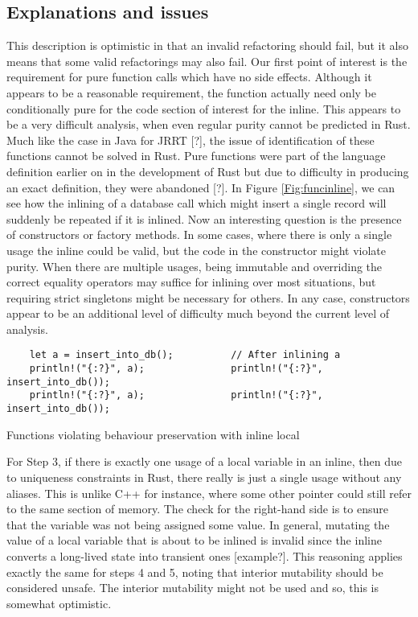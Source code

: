\subsection{Explanations and issues}
This description is optimistic in that an invalid refactoring should fail, but it also means that some valid refactorings may also fail. Our first point of interest is the requirement for pure function calls which have no side effects. Although it appears to be a reasonable requirement, the function actually need only be conditionally pure for the code section of interest for the inline. This appears to be a very difficult analysis, when even regular purity cannot be predicted in Rust. Much like the case in Java for JRRT [?], the issue of identification of these functions cannot be solved in Rust. Pure functions were part of the language definition earlier on in the development of Rust but due to difficulty in producing an exact definition, they were abandoned [?]. In Figure \ref{Fig:funcinline}, we can see how the inlining of a database call which might insert a single record will suddenly be repeated if it is inlined. Now an interesting question is the presence of constructors or factory methods. In some cases, where there is only a single usage the inline could be valid, but the code in the constructor might violate purity. When there are multiple usages, being immutable and overriding the correct equality operators may suffice for inlining over most situations, but requiring strict singletons might be necessary for others. In any case, constructors appear to be an additional level of difficulty much beyond the current level of analysis.

\begin{fig}[H]
\begin{verbatim}
    let a = insert_into_db();          // After inlining a
    println!("{:?}", a);               println!("{:?}", insert_into_db());
    println!("{:?}", a);               println!("{:?}", insert_into_db());
\end{verbatim}
\caption{Functions violating behaviour preservation with inline local}
\label{Fig:funcinline}
\end{fig}

For Step 3, if there is exactly one usage of a local variable in an inline, then due to uniqueness constraints in Rust, there really is just a single usage without any aliases. This is unlike C++ for instance, where some other pointer could still refer to the same section of memory. The check for the right-hand side is to ensure that the variable was not being assigned some value. In general, mutating the value of a local variable that is about to be inlined is invalid since the inline converts a long-lived state into transient ones [example?]. This reasoning applies exactly the same for steps 4 and 5, noting that interior mutability should be considered unsafe. The interior mutability might not be used and so, this is somewhat optimistic.



